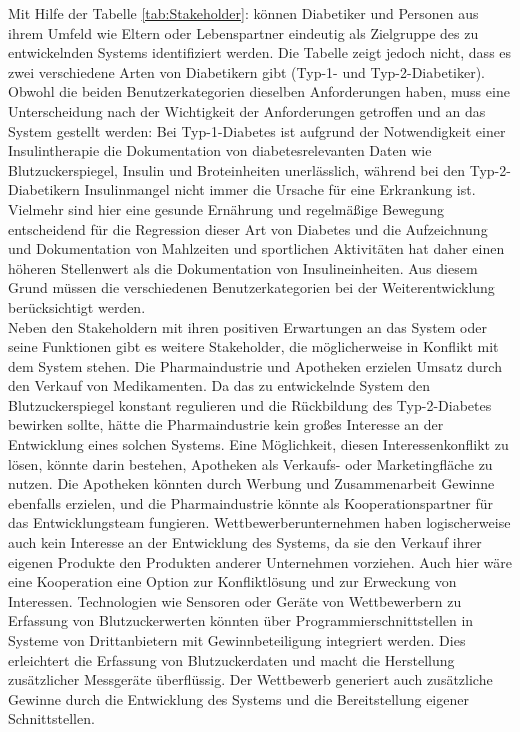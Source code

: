 	\setlength{\parindent}{0pt}Mit Hilfe der Tabelle \ref{tab:Stakeholder}: \glqq {}\grqq{} können Diabetiker und Personen aus ihrem Umfeld wie Eltern oder Lebenspartner eindeutig als Zielgruppe des zu entwickelnden Systems identifiziert werden. Die Tabelle zeigt jedoch nicht, dass es zwei verschiedene Arten von Diabetikern gibt (Typ-1- und Typ-2-Diabetiker). Obwohl die beiden Benutzerkategorien dieselben Anforderungen haben, muss eine Unterscheidung nach der Wichtigkeit der Anforderungen getroffen und an das System gestellt werden: Bei Typ-1-Diabetes ist aufgrund der Notwendigkeit einer Insulintherapie die Dokumentation von diabetesrelevanten Daten wie Blutzuckerspiegel, Insulin und Broteinheiten unerlässlich, während bei den Typ-2-Diabetikern Insulinmangel nicht immer die Ursache für eine Erkrankung ist. Vielmehr sind hier eine gesunde Ernährung und regelmäßige Bewegung entscheidend für die Regression dieser Art von Diabetes und die Aufzeichnung und Dokumentation von Mahlzeiten und sportlichen Aktivitäten hat daher einen höheren Stellenwert als die Dokumentation von Insulineinheiten. Aus diesem Grund müssen die verschiedenen Benutzerkategorien bei der Weiterentwicklung berücksichtigt werden.\\
	Neben den Stakeholdern mit ihren positiven Erwartungen an das System oder seine Funktionen gibt es weitere Stakeholder, die möglicherweise in Konflikt mit dem System stehen. Die Pharmaindustrie und Apotheken erzielen Umsatz durch den Verkauf von Medikamenten. Da das zu entwickelnde System den Blutzuckerspiegel konstant regulieren und die Rückbildung des Typ-2-Diabetes bewirken sollte, hätte die Pharmaindustrie kein großes Interesse an der Entwicklung eines solchen Systems. Eine Möglichkeit, diesen Interessenkonflikt zu lösen, könnte darin bestehen, Apotheken als Verkaufs- oder Marketingfläche zu nutzen. Die Apotheken könnten durch Werbung und Zusammenarbeit Gewinne ebenfalls erzielen, und die Pharmaindustrie könnte als Kooperationspartner für das Entwicklungsteam fungieren. Wettbewerberunternehmen haben logischerweise auch kein Interesse an der Entwicklung des Systems, da sie den Verkauf ihrer eigenen Produkte den Produkten anderer Unternehmen vorziehen. Auch hier wäre eine Kooperation eine Option zur Konfliktlösung und zur Erweckung von Interessen. Technologien wie Sensoren oder Geräte von Wettbewerbern zu Erfassung von Blutzuckerwerten könnten über Programmierschnittstellen in Systeme von Drittanbietern mit Gewinnbeteiligung integriert werden. Dies erleichtert die Erfassung von Blutzuckerdaten und macht die Herstellung zusätzlicher Messgeräte überflüssig. Der Wettbewerb generiert auch zusätzliche Gewinne durch die Entwicklung des Systems und die Bereitstellung eigener Schnittstellen.	
